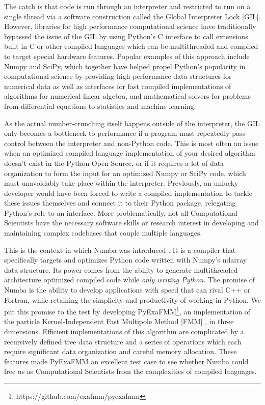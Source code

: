 \documentclass{IEEEcsmag}
\begin{document}
The catch is that code is run through an interpreter and restricted to run on a single thread via a software construction called the Global Interpreter Lock [GIL]. However, libraries for high performance computational science have traditionally bypassed the issue of the GIL by using Python's C interface to call extensions built in C or other compiled languages which can be multithreaded and compiled to target special hardware features. Popular examples of this approach include Numpy and SciPy, which together have helped propel Python's popularity in computational science by providing high performance data structures for numerical data as well as interfaces for fast compiled implementations of algorithms for numerical linear algebra, and mathematical solvers for problems from differential equations to statistics and machine learning.

As the actual number-crunching itself happens outside of the interpreter, the GIL only becomes a bottleneck to performance if a program must repeatedly pass control between the interpreter and non-Python code. This is most often an issue when an optimized compiled language implementation of your desired algorithm doesn't exist in the Python Open Source, or if it requires a lot of data organization to form the input for an optimized Numpy or SciPy code, which must unavoidably take place within the interpreter. Previously, an unlucky developer would have been forced to write a compiled implementation to tackle these issues themselves and connect it to their Python package, relegating Python's role to an interface. More problematically, not all Computational Scientists have the necessary software skills or research interest in developing and maintaining complex codebases that couple multiple languages.

This is the context in which Numba was introduced \cite{Lam2015}. It is a compiler that specifically targets and optimizes Python code written with Numpy's ndarray data structure. Its power comes from the ability to generate multithreaded architecture optimized compiled code while \textit{only writing Python}. The promise of Numba is the ability to develop applications with speed that can rival C++ or Fortran, while retaining the simplicity and productivity of working in Python. We put this promise to the test by developing PyExaFMM\footnote{https://github.com/exafmm/pyexafmm}, an implementation of the particle Kernel-Independent Fast Multipole Method [FMM] \cite{Ying2004,Greengard1987}, in three dimensions. Efficient implementations of this algorithm are complicated by a recursively defined tree data structure and a series of operations which each require significant data organization and careful memory allocation. These features made PyExaFMM an excellent test case to see whether Numba could free us as Computational Scientists from the complexities of compiled languages.
\end{document}
